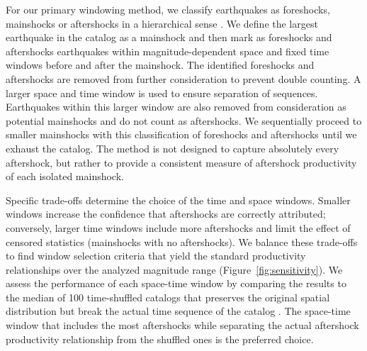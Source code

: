 \documentclass[draft, jgrga]{agujournal2018}
\begin{document}
For our primary windowing method, we classify earthquakes as foreshocks, mainshocks or aftershocks in a hierarchical sense \citep[following][]{felzer2006decay, Brodsky2011TheForeshocks, Wetzler2016, Garza-Giron2018Mainshock-AftershockRegions}. We define the largest earthquake in the catalog as a mainshock and then mark as foreshocks and aftershocks earthquakes within magnitude-dependent space and fixed time windows before and after the mainshock. The identified foreshocks and aftershocks are removed from further consideration to prevent double counting. A larger space and time window is used to ensure separation of sequences. Earthquakes within this larger window are also removed from consideration as potential mainshocks and do not count as aftershocks. We sequentially proceed to smaller mainshocks with this classification of foreshocks and aftershocks until we exhaust the catalog. The method is not designed to capture absolutely every aftershock, but rather to provide a consistent measure of aftershock productivity of each isolated mainshock.  

Specific trade-offs determine the choice of the time and space windows. Smaller windows increase the confidence that aftershocks are correctly attributed; conversely, larger time windows include more aftershocks and limit the effect of censored statistics (mainshocks with no aftershocks). We balance these trade-offs to find window selection criteria that yield the standard productivity relationships over the analyzed magnitude range (Figure~\ref{fig:sensitivity}). We assess the performance of each space-time window by comparing the results to the median of 100 time-shuffled catalogs that preserves the original spatial distribution but break the actual time sequence of the catalog \citep{Garza-Giron2018Mainshock-AftershockRegions}. The space-time window that includes the most aftershocks while separating the actual aftershock productivity relationship from the shuffled ones is the preferred choice.
\end{document}

